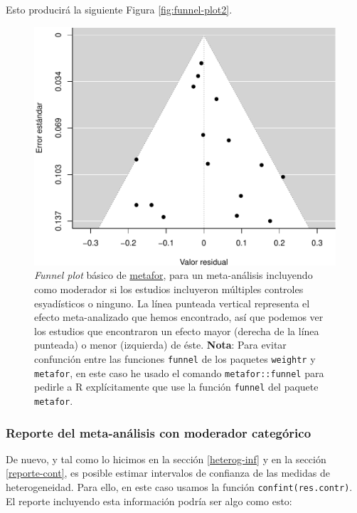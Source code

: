 \documentclass[
  bookmarksnumbered]{article}
\begin{document}
Esto producirá la siguiente Figura \ref{fig:funnel-plot2}.

\begin{figure}
\centering
\includegraphics{Meta-analysis_files/figure-latex/funnel-plot-mod2-1.pdf}
\caption{\label{fig:funnel-plot-mod2}\emph{Funnel plot} básico de \href{https://www.metafor-project.org/doku.php}{metafor}, para un meta-análisis incluyendo como moderador si los estudios incluyeron múltiples controles esyadísticos o ninguno. La línea punteada vertical representa el efecto meta-analizado que hemos encontrado, así que podemos ver los estudios que encontraron un efecto mayor (derecha de la línea punteada) o menor (izquierda) de éste. \textbf{Nota}: Para evitar confunción entre las funciones \texttt{funnel} de los paquetes \texttt{weightr} y \texttt{metafor}, en este caso he usado el comando \texttt{metafor::funnel} para pedirle a R explícitamente que use la función \texttt{funnel} del paquete \texttt{metafor}.}
\end{figure}

\hypertarget{reporte-cat}{%
\subsubsection{Reporte del meta-análisis con moderador categórico}\label{reporte-cat}}

De nuevo, y tal como lo hicimos en la sección \ref{heterog-inf} y en la sección \ref{reporte-cont}, es posible estimar intervalos de confianza de las medidas de heterogeneidad. Para ello, en este caso usamos la función \texttt{confint(res.contr)}. El reporte incluyendo esta información podría ser algo como esto:
\end{document}
